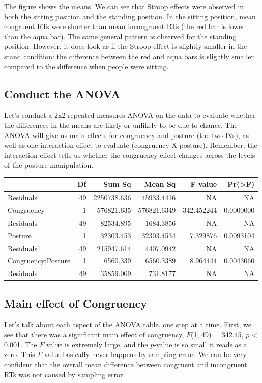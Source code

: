 \documentclass[
]{book}
\begin{document}
The figure shows the means. We can see that Stroop effects were observed in both the sitting position and the standing position. In the sitting position, mean congruent RTs were shorter than mean incongruent RTs (the red bar is lower than the aqua bar). The same general pattern is observed for the standing position. However, it does look as if the Stroop effect is slightly smaller in the stand condition: the difference between the red and aqua bars is slightly smaller compared to the difference when people were sitting.

\subsection{Conduct the ANOVA}\label{conduct-the-anova}

Let's conduct a 2x2 repeated measures ANOVA on the data to evaluate whether the differences in the means are likely or unlikely to be due to chance. The ANOVA will give us main effects for congruency and posture (the two IVs), as well as one interaction effect to evaluate (congruency X posture). Remember, the interaction effect tells us whether the congruency effect changes across the levels of the posture manipulation.

\begin{tabular}{l|r|r|r|r|r}
\hline
  & Df & Sum Sq & Mean Sq & F value & Pr(>F)\\
\hline
Residuals & 49 & 2250738.636 & 45933.4416 & NA & NA\\
\hline
Congruency & 1 & 576821.635 & 576821.6349 & 342.452244 & 0.0000000\\
\hline
Residuals & 49 & 82534.895 & 1684.3856 & NA & NA\\
\hline
Posture & 1 & 32303.453 & 32303.4534 & 7.329876 & 0.0093104\\
\hline
Residuals1 & 49 & 215947.614 & 4407.0942 & NA & NA\\
\hline
Congruency:Posture & 1 & 6560.339 & 6560.3389 & 8.964444 & 0.0043060\\
\hline
Residuals & 49 & 35859.069 & 731.8177 & NA & NA\\
\hline
\end{tabular}

\subsection{Main effect of Congruency}\label{main-effect-of-congruency}

Let's talk about each aspect of the ANOVA table, one step at a time. First, we see that there was a significant main effect of congruency, \(F\)(1, 49) = 342.45, \(p\) \textless{} 0.001. The \(F\) value is extremely large, and the \(p\)-value is so small it reads as a zero. This \(F\)-value basically never happens by sampling error. We can be very confident that the overall mean difference between congruent and incongruent RTs was not caused by sampling error.
\end{document}
